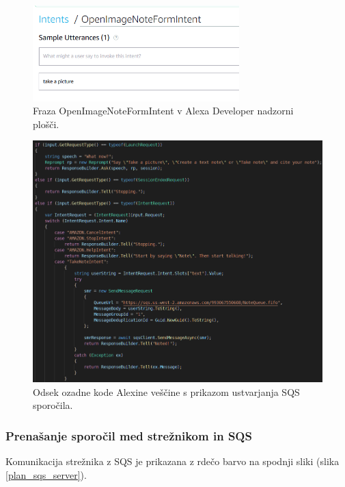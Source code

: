 \documentclass[a4paper, 12pt]{book}
\begin{document}
\begin{figure}[H]
\begin{center}
\includegraphics[width=8cm]{intent_image}
\end{center}
\caption{Fraza OpenImageNoteFormIntent v Alexa Developer nadzorni plošči.}
\label{OpenImageNoteFormIntent}
\end{figure}

\begin{figure}[H]
\begin{center}
\includegraphics[width=13.5cm]{skill_code}
\end{center}
\caption{Odsek ozadne kode Alexine veščine s prikazom ustvarjanja SQS sporočila.}
\label{skill_code}
\end{figure}

\subsubsection{Prenašanje sporočil med strežnikom in SQS}

Komunikacija strežnika z SQS je prikazana z rdečo barvo na spodnji sliki (slika \ref{plan_sqs_server}).
\end{document}
